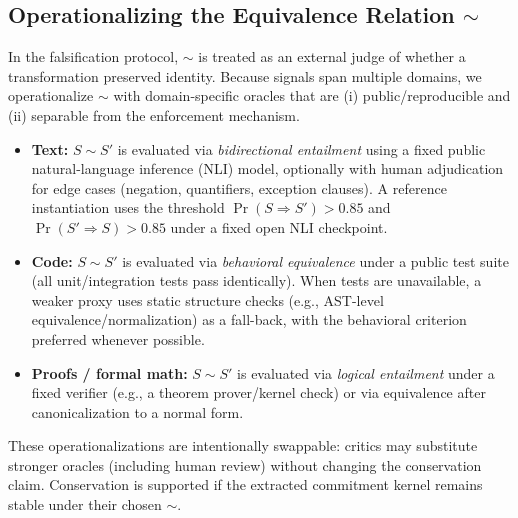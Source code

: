 \documentclass[11pt,a4paper]{article}
\begin{document}
\subsection{Operationalizing the Equivalence Relation \texorpdfstring{$\sim$}{sim}}
\label{sec:sim-operational}

In the falsification protocol, $\sim$ is treated as an external judge of whether a transformation preserved identity. Because signals span multiple domains, we operationalize $\sim$ with domain-specific oracles that are (i) public/reproducible and (ii) separable from the enforcement mechanism.

\begin{itemize}
    \item \textbf{Text:} $S \sim S'$ is evaluated via \emph{bidirectional entailment} using a fixed public natural-language inference (NLI) model, optionally with human adjudication for edge cases (negation, quantifiers, exception clauses). A reference instantiation uses the threshold $\Pr(S \Rightarrow S') > 0.85$ and $\Pr(S' \Rightarrow S) > 0.85$ under a fixed open NLI checkpoint.

    \item \textbf{Code:} $S \sim S'$ is evaluated via \emph{behavioral equivalence} under a public test suite (all unit/integration tests pass identically). When tests are unavailable, a weaker proxy uses static structure checks (e.g., AST-level equivalence/normalization) as a fall-back, with the behavioral criterion preferred whenever possible.

    \item \textbf{Proofs / formal math:} $S \sim S'$ is evaluated via \emph{logical entailment} under a fixed verifier (e.g., a theorem prover/kernel check) or via equivalence after canonicalization to a normal form.
\end{itemize}

These operationalizations are intentionally swappable: critics may substitute stronger oracles (including human review) without changing the conservation claim. Conservation is supported if the extracted commitment kernel remains stable under their chosen $\sim$.
\end{document}
